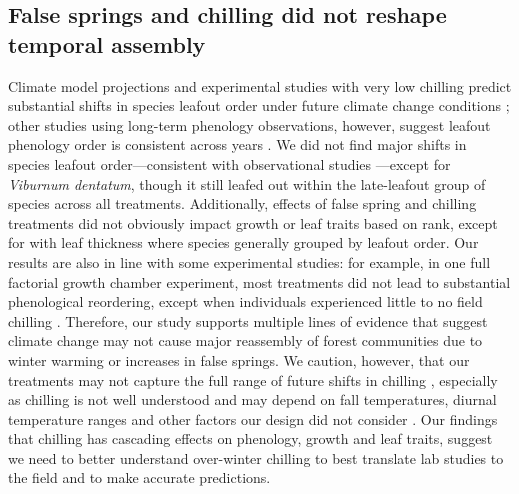 \documentclass{article}\usepackage[]{graphicx}\usepackage[]{color}
\begin{document}
\begin{enumerate}
\subsection*{False springs and chilling did not reshape temporal assembly}
Climate model projections and experimental studies with very low chilling predict substantial shifts in species leafout order under future climate change conditions \citep{Roberts2015, Laube2014}; other studies using long-term phenology observations, however, suggest leafout phenology order is consistent across years \citep{Wesolowski2006}. We did not find major shifts in species leafout order---consistent with observational studies \citep{Wesolowski2006}---except for \textit{Viburnum dentatum}, though it still leafed out within the late-leafout group of species across all treatments. Additionally, effects of false spring and chilling treatments did not obviously impact growth or leaf traits based on rank, except for with leaf thickness where species generally grouped by leafout order. Our results are also in line with some experimental studies: for example, in one full factorial growth chamber experiment, most treatments did not lead to substantial phenological reordering, except when individuals experienced little to no field chilling \citep{Laube2014}. Therefore, our study supports multiple lines of evidence that suggest climate change may not cause major reassembly of forest communities due to winter warming or increases in false springs. We caution, however, that our treatments may not capture the full range of future shifts in chilling \citep[current forecasts for chilling vary highly across regions, see][]{Fraga2019}, especially as chilling is not well understood \citep{Nanninga2017} and may depend on fall temperatures, diurnal temperature ranges and other factors our design did not consider \citep{Dennis2003}. Our findings that chilling has cascading effects on phenology, growth and leaf traits, suggest we need to better understand over-winter chilling to best translate lab studies to the field and to make accurate predictions. 
    

\end{enumerate}
\end{document}
